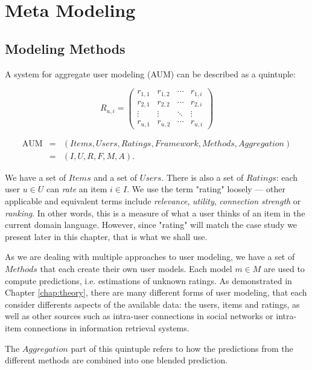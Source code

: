 \section{Meta Modeling}

\subsection{Modeling Methods}

A system for aggregate user modeling (AUM) can be described as a quintuple:

\begin{equation*}
 R_{u,i} =
 \begin{pmatrix}
  r_{1,1} & r_{1,2} & \cdots & r_{1,i} \\
  r_{2,1} & r_{2,2} & \cdots & r_{2,i} \\
  \vdots  & \vdots  & \ddots & \vdots  \\
  r_{u,1} & r_{u,2} & \cdots & r_{u,i}
 \end{pmatrix}
\end{equation*}

\begin{eqnarray*}
  \mathrm{AUM} &=& (Items, Users, Ratings, Framework, Methods, Aggregation)\\
               &=& (I,U,R,F,M,A).
\end{eqnarray*}

We have a set of $Items$ and a set of $Users$.
There is also a set of $Ratings$: each user $u \in U$ can \emph{rate} an item $i \in I$.
We use the term "rating" loosely --- other applicable and equivalent terms include \emph{relevance}, \emph{utility},
\emph{connection strength} or \emph{ranking}. In other words, this is a measure of what a user thinks of an item
in the current domain language. However, since "rating" will match the case study we present later in this chapter,
that is what we shall use.

As we are dealing with multiple approaches to user modeling, we have a set of $Methods$ that each create their own
user models. Each model $m \in M$ are used to compute predictions, i.e. estimations of unknown ratings.
As demonstrated in Chapter \ref{chap:theory}, there are many different forms of user modeling,
that each consider differents aspects of the available data: the users, items and ratings, as well as 
other sources such as intra-user connections in social networks or intra-item connections in information retrieval systems.

The $Aggregation$ part of this quintuple refers to how the predictions from the different methods are combined
into one blended prediction. 

